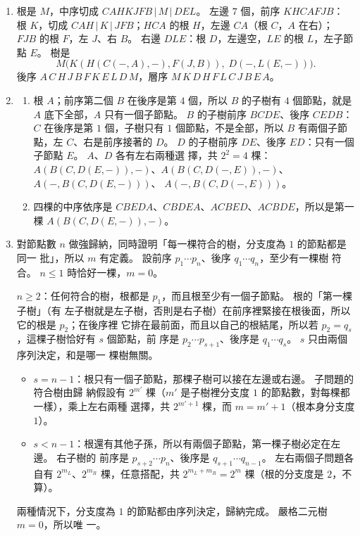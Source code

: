 \begin{enumerate}
\item 根是 $M$，中序切成 $CAHKJFB \,|\, M \,|\, DEL$。 左邊 $7$ 個，前序 $KHCAFJB$：
根 $K$，切成 $CAH \,|\, K \,|\, JFB$；$HCA$ 的根 $H$，左邊 $CA$（根 $C$，$A$ 在右）；
$FJB$ 的根 $F$，左 $J$、右 $B$。 右邊 $DLE$：根 $D$，左邊空，$LE$ 的根 $L$，左子節點
$E$。 樹是
\[
M\bigl(K(H(C(-, A), -), F(J, B)),\; D(-, L(E, -))\bigr).
\]
後序 $A\,C\,H\,J\,B\,F\,K\,E\,L\,D\,M$，層序 $M\,K\,D\,H\,F\,L\,C\,J\,B\,E\,A$。

\item
\begin{enumerate}
\item 根 $A$；前序第二個 $B$ 在後序是第 $4$ 個，所以 $B$ 的子樹有 $4$ 個節點，就是
$A$ 底下全部，$A$ 只有一個子節點。 $B$ 的子樹前序 $BCDE$、後序 $CEDB$：$C$ 在後序是第
$1$ 個，子樹只有 $1$ 個節點，不是全部，所以 $B$ 有兩個子節點，左 $C$、右是前序接著的
$D$。 $D$ 的子樹前序 $DE$、後序 $ED$：只有一個子節點 $E$。 $A$、$D$ 各有左右兩種選
擇，共 $2^2 = 4$ 棵：
$A(B(C, D(E, -)), -)$、$A(B(C, D(-, E)), -)$、$A(-, B(C, D(E, -)))$、
$A(-, B(C, D(-, E)))$。
\item 四棵的中序依序是 $CBEDA$、$CBDEA$、$ACBED$、$ACBDE$，所以是第一棵
$A(B(C, D(E, -)), -)$。
\end{enumerate}

\item 對節點數 $n$ 做強歸納，同時證明「每一棵符合的樹，分支度為 $1$ 的節點都是同一
批」，所以 $m$ 有定義。 設前序 $p_1 \cdots p_n$、後序 $q_1 \cdots q_n$，至少有一棵樹
符合。 $n \le 1$ 時恰好一棵，$m = 0$。

$n \ge 2$：任何符合的樹，根都是 $p_1$，而且根至少有一個子節點。 根的「第一棵子樹」（有
左子樹就是左子樹，否則是右子樹）在前序裡緊接在根後面，所以它的根是 $p_2$；在後序裡
它排在最前面，而且以自己的根結尾，所以若 $p_2 = q_s$，這棵子樹恰好有 $s$ 個節點，前
序是 $p_2 \cdots p_{s+1}$、後序是 $q_1 \cdots q_s$。 $s$ 只由兩個序列決定，和是哪一
棵樹無關。
\begin{itemize}
\item $s = n - 1$：根只有一個子節點，那棵子樹可以接在左邊或右邊。 子問題的符合樹由歸
納假設有 $2^{m'}$ 棵（$m'$ 是子樹裡分支度 $1$ 的節點數，對每棵都一樣），乘上左右兩種
選擇，共 $2^{m'+1}$ 棵，而 $m = m' + 1$（根本身分支度 $1$）。
\item $s < n - 1$：根還有其他子孫，所以有兩個子節點，第一棵子樹必定在左邊。 右子樹的
前序是 $p_{s+2} \cdots p_n$、後序是 $q_{s+1} \cdots q_{n-1}$。 左右兩個子問題各自有
$2^{m_L}$、$2^{m_R}$ 棵，任意搭配，共 $2^{m_L + m_R} = 2^m$ 棵（根的分支度是 $2$，不
算）。
\end{itemize}
兩種情況下，分支度為 $1$ 的節點都由序列決定，歸納完成。 嚴格二元樹 $m = 0$，所以唯
一。


\end{enumerate}
